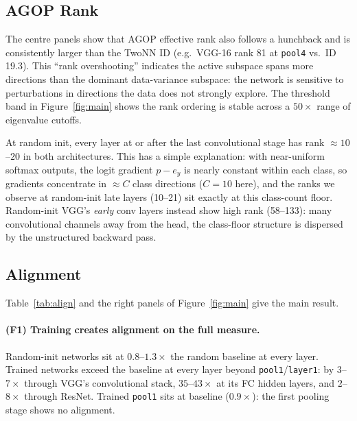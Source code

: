 \documentclass{article}
\begin{document}
\subsection{AGOP Rank}

The centre panels show that AGOP effective rank also follows a hunchback and
is consistently larger than the TwoNN ID (e.g.\ VGG-16 rank 81 at
\texttt{pool4} vs.\ ID 19.3).  This ``rank overshooting'' indicates the
active subspace spans more directions than the dominant data-variance
subspace: the network is sensitive to perturbations in directions the data
does not strongly explore.  The threshold band in Figure~\ref{fig:main}
shows the rank ordering is stable across a $50\times$ range of eigenvalue
cutoffs.

At random init, every layer at or after the last convolutional stage has
rank ${\approx}10$--$20$ in both architectures.  This has a simple
explanation: with near-uniform softmax outputs, the logit gradient
$p - e_y$ is nearly constant within each class, so gradients concentrate in
$\approx C$ class directions ($C=10$ here), and the ranks we observe at
random-init late layers (10--21) sit exactly at this class-count floor.
Random-init VGG's \emph{early} conv layers instead show high rank
(58--133): many convolutional channels away from the head, the class-floor
structure is dispersed by the unstructured backward pass.

\subsection{Alignment}

\begin{table}[t]
\centering
\caption{Alignment at every probed layer (no row selection): mean
$\cos^2\theta$ between top-$k$ PCA and AGOP subspaces, ratio over the $k/d$
baseline, split-half ratio (subspaces from disjoint image halves), and
within-class$\times$split-half ratio (class means removed from both
objects, then split-half).  ResNet's \texttt{avgpool} probe is omitted: it
is identical to GAP(\texttt{layer4}) by construction and matches it to
$10^{-9}$.  ID is the Facco CDF-fit estimate $\pm$ subsample std.}
\label{tab:align}
\small

\end{table}

Table~\ref{tab:align} and the right panels of Figure~\ref{fig:main} give the
main result.

\paragraph{(F1) Training creates alignment on the full measure.}
Random-init networks sit at $0.8$--$1.3\times$ the random baseline at every
layer.  Trained networks exceed the baseline at every layer beyond
\texttt{pool1}/\texttt{layer1}: by $3$--$7\times$ through VGG's
convolutional stack, $35$--$43\times$ at its FC hidden layers, and
$2$--$8\times$ through ResNet.  Trained \texttt{pool1} sits at baseline
($0.9\times$): the first pooling stage shows no alignment.
\end{document}

